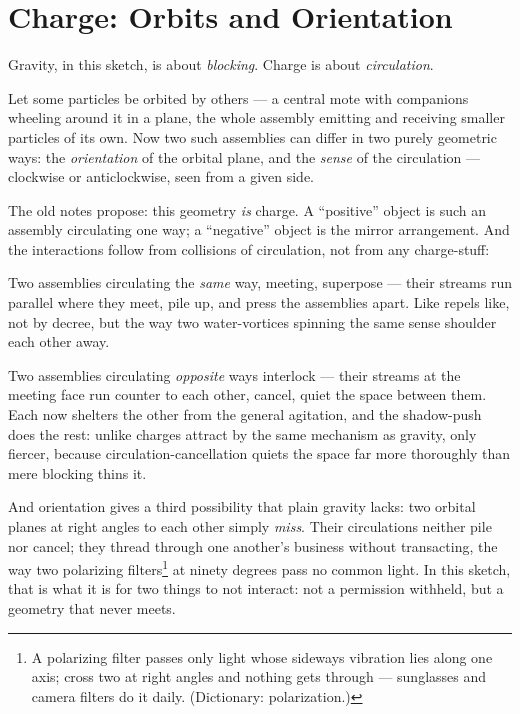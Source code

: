 \documentclass[fontsize=11pt,paper=a4,pagesize=auto,parskip=half-]{scrbook}
\begin{document}
\section{Charge: Orbits and Orientation}

Gravity, in this sketch, is about \emph{blocking}. Charge is about \emph{circulation}.

Let some particles be orbited by others --- a central mote with companions wheeling around it in a plane, the whole assembly emitting and receiving smaller particles of its own. Now two such assemblies can differ in two purely geometric ways: the \emph{orientation} of the orbital plane, and the \emph{sense} of the circulation --- clockwise or anticlockwise, seen from a given side.

The old notes propose: this geometry \emph{is} charge. A ``positive'' object is such an assembly circulating one way; a ``negative'' object is the mirror arrangement. And the interactions follow from collisions of circulation, not from any charge-stuff:

Two assemblies circulating the \emph{same} way, meeting, superpose --- their streams run parallel where they meet, pile up, and press the assemblies apart. Like repels like, not by decree, but the way two water-vortices spinning the same sense shoulder each other away.

Two assemblies circulating \emph{opposite} ways interlock --- their streams at the meeting face run counter to each other, cancel, quiet the space between them. Each now shelters the other from the general agitation, and the shadow-push does the rest: unlike charges attract by the same mechanism as gravity, only fiercer, because circulation-cancellation quiets the space far more thoroughly than mere blocking thins it.

And orientation gives a third possibility that plain gravity lacks: two orbital planes at right angles to each other simply \emph{miss}. Their circulations neither pile nor cancel; they thread through one another's business without transacting, the way two polarizing filters\footnote{A polarizing filter passes only light whose sideways vibration lies along one axis; cross two at right angles and nothing gets through --- sunglasses and camera filters do it daily. (Dictionary: polarization.)} at ninety degrees pass no common light. In this sketch, that is what it is for two things to not interact: not a permission withheld, but a geometry that never meets.
\end{document}
